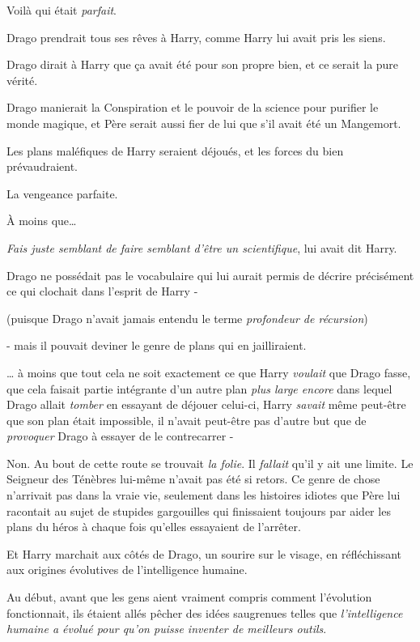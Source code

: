 Voilà qui était \emph{parfait}.

Drago prendrait tous ses rêves à Harry, comme Harry lui avait pris les siens.

Drago dirait à Harry que ça avait été pour son propre bien, et ce serait la pure vérité.

Drago manierait la Conspiration et le pouvoir de la science pour purifier le monde magique, et Père serait aussi fier de lui que s'il avait été un Mangemort.

Les plans maléfiques de Harry seraient déjoués, et les forces du bien prévaudraient.

La vengeance parfaite.

À moins que…

\emph{Fais juste semblant de faire semblant d'être un scientifique}, lui avait dit Harry.

Drago ne possédait pas le vocabulaire qui lui aurait permis de décrire précisément ce qui clochait dans l'esprit de Harry -

(puisque Drago n'avait jamais entendu le terme \emph{profondeur de récursion})

- mais il pouvait deviner le genre de plans qui en jailliraient.

… à moins que tout cela ne soit exactement ce que Harry \emph{voulait} que Drago fasse, que cela faisait partie intégrante d'un autre plan \emph{plus large encore} dans lequel Drago allait \emph{tomber} en essayant de déjouer celui-ci, Harry \emph{savait} même peut-être que son plan était impossible, il n'avait peut-être pas d'autre but que de \emph{provoquer} Drago à essayer de le contrecarrer -

Non. Au bout de cette route se trouvait \emph{la folie}. Il \emph{fallait} qu'il y ait une limite. Le Seigneur des Ténèbres lui-même n'avait pas été si retors. Ce genre de chose n'arrivait pas dans la vraie vie, seulement dans les histoires idiotes que Père lui racontait au sujet de stupides gargouilles qui finissaient toujours par aider les plans du héros à chaque fois qu'elles essayaient de l'arrêter.

\later

Et Harry marchait aux côtés de Drago, un sourire sur le visage, en réfléchissant aux origines évolutives de l'intelligence humaine.

Au début, avant que les gens aient vraiment compris comment l'évolution fonctionnait, ils étaient allés pêcher des idées saugrenues telles que \emph{l'intelligence humaine a évolué pour qu'on puisse inventer de meilleurs outils}.

